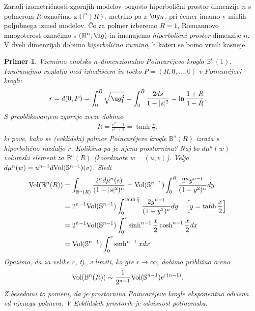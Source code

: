 \documentclass[a4paper]{article}
\newtheorem{primer}{Primer}
\begin{document}
Zaradi izometričnosti zgornjih modelov pogosto hiperbolični prostor dimenzije $n$ s polmerom $R$ označimo z $\mathbb{H}^{n}(R)$, metriko pa z $\u g_{R}$, pri čemer imamo v mislih poljubnega izmed modelov. Če za polmer izberemo $R=1$, Riemannovo mnogoterost označimo s $(\mathbb{H}^{n}, \u g)$ in imenujemo \emph{hiperbolični prostor} dimenzije $n$. V dveh dimenzijah dobimo \emph{hiperbolično ravnino}, h kateri se bomo vrnili kasneje.

\begin{primer}
Vzemimo enotsko $n$-dimenzionalno Poincar\'ejevo kroglo $\mathbb{B}^{n}(1)$. Izračunajmo razdaljo med izhodiščem in točko $P = (R,0, \dots , 0)$ v Poincar\'ejevi krogli:
\begin{gather}
r = d(0, P) = \int_{0}^{R} \sqrt{\u g_{1}^{3}} = \int_{0}^{R} \frac{2ds}{1-|s|^2} = \ln{\frac{1+R}{1-R}}.
\end{gather}
S preoblikovanjem zgornje zveze dobimo 
\begin{gather}
R = \frac{e^{r}-1}{e^{r}+1} = \tanh{\frac{r}{2}},
\end{gather}
ki pove, kako se (evklidski) polmer Poincar\'ejeve krogle $\mathbb{B}^{n}(R)$ izraža s hiperbolično razdaljo $r$.\newline 
Kolikšna pa je njena prostornina?
Naj bo $d\mu^{n}(w)$ volumski element za $\mathbb{B}^{n}(R)$ (koordinate $w=(u,v)$). Velja $d\mu^{n}(w) = u^{n-1} d\textup{Vol}(\mathbb{S}^{n-1})(v)$. Sledi 
\begin{align*}
\textup{Vol}(\mathbb{B}^{n}(R)) &= \int_{\mathbb{B}^{n}(R)} \frac{2^{n} d\mu^{n}(s)}{(1-|s|^2)^{n}} = \textup{Vol}(\mathbb{S}^{n-1}) \int_{0}^{R} \frac{2^{n} y^{n-1}}{(1-y^{2})^{n}} dy \\ 
&= 2^{n-1} \textup{Vol}(\mathbb{S}^{n-1}) \int_{0}^{\tanh{\frac{r}{2}}} \frac{2 y^{n-1}}{(1-y^{2})^{n}} dy \quad \left[y = \tanh{\frac{x}{2}} \right] \\
&= 2^{n-1} \textup{Vol}(\mathbb{S}^{n-1}) \int_{0}^{r} \sinh^{n-1}{\frac{x}{2}} \cosh^{n-1}{\frac{x}{2}} dx \\
&= \textup{Vol}(\mathbb{S}^{n-1}) \int_{0}^{r} \sinh^{n-1}{x} dx
\end{align*}
Opazimo, da za velike $r$, tj.~v limiti, ko gre $r \to \infty$, dobimo približno oceno
\begin{gather*}
\textup{Vol}(\mathbb{B}^{n}(R)) \sim \frac{1}{2^{n-1}} \textup{Vol}(\mathbb{S}^{n-1}) e^{r(n-1)}.
\end{gather*}
Z besedami to pomeni, da je prostornina Poincar\'ejeve krogle eksponentno odvisna od njenega polmera. V Evklidskih prostorih je odvisnost polinomska.
\end{primer}
\end{document}
